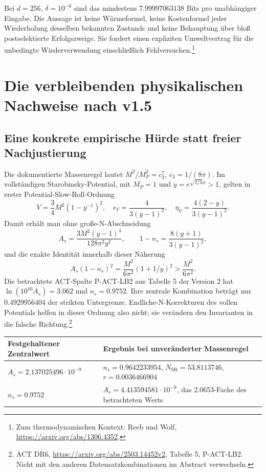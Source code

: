 Bei $d=256$, $\delta=10^{-6}$ sind das mindestens $7.99997063138$ Bits pro unabhängiger Eingabe. Die Aussage ist keine Wärmeformel, keine Kostenformel jeder Wiederholung desselben bekannten Zustands und keine Behauptung über bloß postselektierte Erfolgszweige. Sie fordert einen expliziten Umweltvertrag für die unbedingte Wiederverwendung einschließlich Fehlversuchen.\footnote{Zum thermodynamischen Kontext: Reeb und Wolf, \url{https://arxiv.org/abs/1306.4352}.}

\chapter{Die verbleibenden physikalischen Nachweise nach v1.5}
\label{ch:frontier15}
\section{Eine konkrete empirische Hürde statt freier Nachjustierung}
Die dokumentierte Massenregel lautet $M^2/M_P^2=c_3^7$, $c_3=1/(8\pi)$. Im vollständigen Starobinsky-Potential, mit $M_P=1$ und $y=e^{\sqrt{2/3}\phi}>1$, gelten in erster Potential-Slow-Roll-Ordnung
\[
V=\frac34M^2(1-y^{-1})^2,\quad
\epsilon_V=\frac4{3(y-1)^2},\quad
\eta_V=\frac{4(2-y)}{3(y-1)^2}.
\]
Damit erhält man ohne große-N-Abschneidung
\[
A_s=\frac{3M^2(y-1)^4}{128\pi^2y^2},\qquad
1-n_s=\frac{8(y+1)}{3(y-1)^2},
\]
und die exakte Identität innerhalb dieser Näherung
\[
\boxed{A_s(1-n_s)^2=\frac{M^2}{6\pi^2}(1+1/y)^2
>\frac{M^2}{6\pi^2}.}
\]
Die betrachtete ACT-Spalte P-ACT-LB2 aus Tabelle 5 der Version 2 hat $\ln(10^{10}A_s)=3.062$ und $n_s=0.9752$. Ihre zentrale Kombination beträgt nur $0.4929956404$ der strikten Untergrenze. Endliche-N-Korrekturen des vollen Potentials helfen in dieser Ordnung also nicht; sie verändern den Invarianten in die falsche Richtung.\footnote{ACT DR6, \url{https://arxiv.org/abs/2503.14452v2}, Tabelle 5, P-ACT-LB2. Nicht mit den anderen Datensatzkombinationen im Abstract verwechseln.}

\begin{tabularx}{\linewidth}{L{43mm}Y}
\toprule Festgehaltener Zentralwert&Ergebnis bei unveränderter Massenregel\\\midrule
$A_s=2.137025496\cdot10^{-9}$&$n_s=0.9642233954$, $N_\mathrm{SR}=53.8113746$, $r=0.0036466904$\\
$n_s=0.9752$&$A_s=4.413594581\cdot10^{-9}$, das 2.0653-Fache des betrachteten Werts\\\bottomrule
\end{tabularx}

